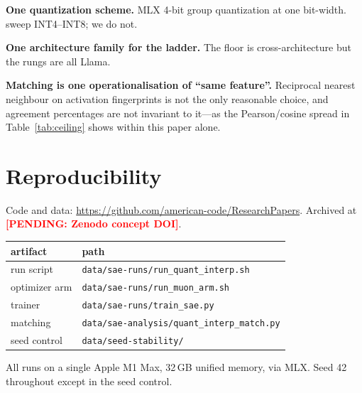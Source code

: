 \documentclass[11pt,a4paper]{article}
\newcounter{pendingcount}
\DeclareRobustCommand{\pending}[1]{\stepcounter{pendingcount}%
  \textcolor{red}{\textbf{[PENDING: #1]}}}
\begin{document}
\textbf{One quantization scheme.} MLX 4-bit group quantization at one bit-width.
\citeauthor{duan2026quant} sweep INT4--INT8; we do not.

\textbf{One architecture family for the ladder.} The floor is cross-architecture but
the rungs are all Llama.

\textbf{Matching is one operationalisation of ``same feature''.} Reciprocal nearest
neighbour on activation fingerprints is not the only reasonable choice, and agreement
percentages are not invariant to it---as the Pearson/cosine spread in
Table~\ref{tab:ceiling} shows within this paper alone.

\section{Reproducibility}

Code and data: \url{https://github.com/american-code/ResearchPapers}. Archived at
\pending{Zenodo concept DOI}.

\begin{center}
\begin{tabular}{ll}
\toprule
artifact & path \\
\midrule
run script          & \texttt{data/sae-runs/run\_quant\_interp.sh} \\
optimizer arm       & \texttt{data/sae-runs/run\_muon\_arm.sh} \\
trainer             & \texttt{data/sae-runs/train\_sae.py} \\
matching            & \texttt{data/sae-analysis/quant\_interp\_match.py} \\
seed control        & \texttt{data/seed-stability/} \\
\bottomrule
\end{tabular}
\end{center}

All runs on a single Apple M1 Max, 32\,GB unified memory, via MLX. Seed 42 throughout
except in the seed control.



\end{document}

